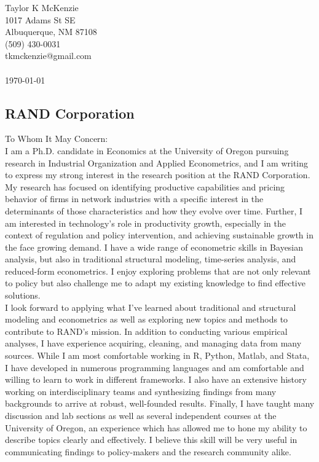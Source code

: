 \documentclass[]{article}
\begin{document}
\thispagestyle{empty}

\noindent Taylor K McKenzie\\1017 Adams St SE\\ Albuquerque, NM 87108\\ (509) 430-0031\\ tkmckenzie@gmail.com\\ \\
\today

\subsection*{RAND Corporation}

To Whom It May Concern: \\

I am a Ph.D. candidate in Economics at the University of Oregon pursuing research in Industrial Organization and Applied Econometrics, and I am writing to express my strong interest in the research position at the RAND Corporation. My research has focused on identifying productive capabilities and pricing behavior of firms in network industries with a specific interest in the determinants of those characteristics and how they evolve over time. Further, I am interested in technology's role in productivity growth, especially in the context of regulation and policy intervention, and achieving sustainable growth in the face growing demand. I have a wide range of econometric skills in Bayesian analysis, but also in traditional structural modeling, time-series analysis, and reduced-form econometrics. I enjoy exploring problems that are not only relevant to policy but also challenge me to adapt my existing knowledge to find effective solutions.\\

I look forward to applying what I've learned about traditional and structural modeling and econometrics as well as exploring new topics and methods to contribute to RAND's mission. In addition to conducting various empirical analyses, I have experience acquiring, cleaning, and managing data from many sources. While I am most comfortable working in R, Python, Matlab, and Stata, I have developed in numerous programming languages and am comfortable and willing to learn to work in different frameworks. I also have an extensive history working on interdisciplinary teams and synthesizing findings from many backgrounds to arrive at robust, well-founded results. Finally, I have taught many discussion and lab sections as well as several independent courses at the University of Oregon, an experience which has allowed me to hone my ability to describe topics clearly and effectively. I believe this skill will be very useful in communicating findings to policy-makers and the research community alike.\\
\end{document}
